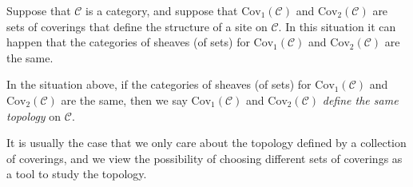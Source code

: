 \noindent
Suppose that $\mathcal{C}$ is a category, and suppose that
$\text{Cov}_1(\mathcal{C})$ and $\text{Cov}_2(\mathcal{C})$
are sets of coverings that define the structure of a site
on $\mathcal{C}$. In this situation it can happen that
the categories of sheaves (of sets) for $\text{Cov}_1(\mathcal{C})$
and $\text{Cov}_2(\mathcal{C})$ are the same. 

\begin{definition}
\label{definition-topology}
In the situation above, if the categories of sheaves (of sets)
for $\text{Cov}_1(\mathcal{C})$ and $\text{Cov}_2(\mathcal{C})$
are the same, then we say $\text{Cov}_1(\mathcal{C})$ and
$\text{Cov}_2(\mathcal{C})$ {\it define the same topology} on
$\mathcal{C}$.
\end{definition}

\noindent
It is usually the case that we only care about the topology defined
by a collection of coverings, and we view the possibility of choosing
different sets of coverings as a tool to study the topology.

